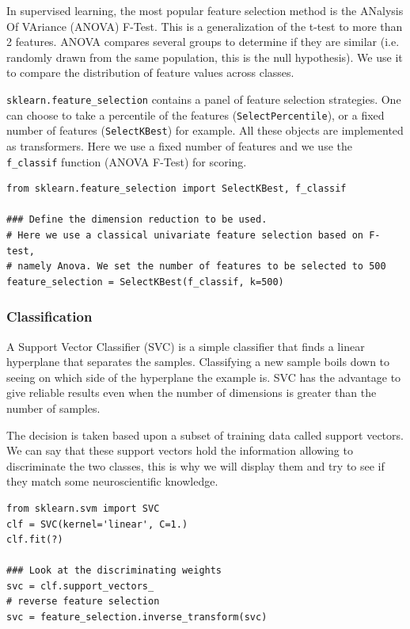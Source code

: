 \documentclass{frontiersSCNS} %
\begin{document}
In supervised learning, the most popular feature selection method is the
ANalysis Of VAriance (ANOVA) F-Test. This is a generalization of the t-test to
more than 2 features. ANOVA compares several
groups to determine if they are similar (i.e. randomly drawn from the same
population, this is the null hypothesis). We use it to compare the distribution
of feature values across classes.

\verb!sklearn.feature_selection! contains a panel of feature selection
strategies. One can choose to take a percentile of the features
(\verb!SelectPercentile!), or a fixed number of features (\verb!SelectKBest!)
for example. All these objects are implemented as transformers.
Here we use a fixed number of features and we use the \verb!f_classif! function
(ANOVA F-Test) for scoring.

\begin{lstlisting}
from sklearn.feature_selection import SelectKBest, f_classif

### Define the dimension reduction to be used.
# Here we use a classical univariate feature selection based on F-test,
# namely Anova. We set the number of features to be selected to 500
feature_selection = SelectKBest(f_classif, k=500)
\end{lstlisting}

\subsubsection{Classification}

A Support Vector Classifier (SVC) is a simple classifier that finds a linear
hyperplane that separates the samples. Classifying a new sample boils down to
seeing on which side of the hyperplane the example is. SVC has the advantage to
give reliable results even when the number of dimensions is greater than the
number of samples.

The decision is taken based upon a subset of training data called support
vectors. We can say that these support vectors hold the information allowing to
discriminate the two classes, this is why we will display them and try to see if
they match some neuroscientific knowledge.

\begin{lstlisting}
from sklearn.svm import SVC
clf = SVC(kernel='linear', C=1.)
clf.fit(?)

### Look at the discriminating weights
svc = clf.support_vectors_
# reverse feature selection
svc = feature_selection.inverse_transform(svc)
\end{lstlisting}
\end{document}
